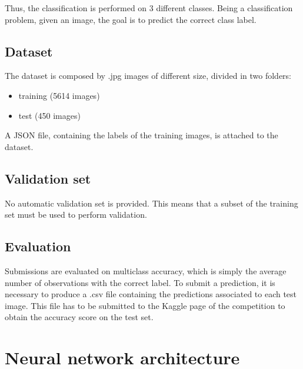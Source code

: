 \documentclass[12pt,a4paper]{report}
\begin{document}
Thus, the classification is performed on 3 different classes. Being a classification problem, given an image, the goal is to predict the correct class label.

	\section{Dataset}

The dataset is composed by .jpg images of different size, divided in two folders:
			\begin{itemize}
				\item training (5614 images)
				\item test (450 images)
			\end{itemize}

A JSON file, containing the labels of the training images, is attached to the dataset.

	\section{Validation set}

No automatic validation set is provided. This means that a subset of the training set must be used to perform validation.


	\section{Evaluation}
Submissions are evaluated on multiclass accuracy, which is simply the average number of observations with the correct label.
To submit a prediction, it is necessary to produce a .csv file containing the predictions associated to each test image. This file has to be submitted to the Kaggle page of the competition to obtain the accuracy score on the test set.


	\chapter{Neural network architecture}
\end{document}
